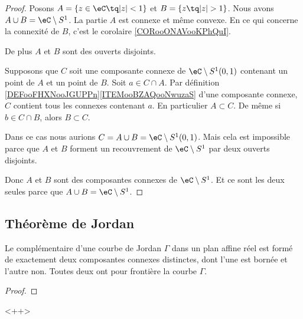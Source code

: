 \begin{proof}
	Posons \( A=\{ z\in \eC\tq | z |<1 \}\) et \( B=\{ z\tq| z |>1 \}\). Nous avons \( A\cup B=\eC\setminus S^1\). La partie \( A\) est connexe et même convexe. En ce qui concerne la connexité de \( B\), c'est le corolaire \ref{CORooONAVooKPhQuI}.

	De plus \( A\) et \( B\) sont des ouverts disjoints.

	Supposons que \( C\) soit une composante connexe de \( \eC\setminus S^1(0,1)\) contenant un point de \( A\) et un point de \( B\). Soit \( a\in C\cap A\). Par définition \ref{DEFooFHXNooJGUPPn}\ref{ITEMooBZAQooNwuzaS} d'une composante connexe, \( C\) contient tous les connexes contenant \( a\). En particulier \( A\subset C\). De même si \( b\in C\cap B\), alors \( B\subset C\).

	Dans ce cas nous aurions \( C=A\cup B=\eC\setminus S^1(0,1)\). Mais cela est impossible parce que \( A\) et \( B\) forment un recouvrement de \( \eC\setminus S^1\) par deux ouverts disjoints.

	Donc \( A\) et \( B\) sont des composantes connexes de \( \eC\setminus S^1\). Et ce sont les deux seules parce que \( A\cup B=\eC\setminus S^1\).
\end{proof}

\subsection{Théorème de Jordan}

\begin{theorem}\label{ThoHSPWBuh}
	Le complémentaire d'une courbe de Jordan \( \Gamma\) dans un plan affine réel est formé de exactement deux composantes connexes distinctes, dont l'une est bornée et l'autre non. Toutes deux ont pour frontière la courbe \( \Gamma\).
\end{theorem}

\begin{proof}

\end{proof}<++>

